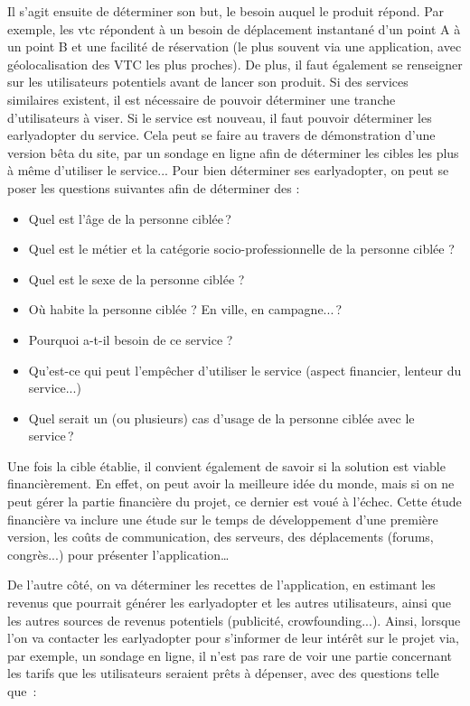 Il s'agit ensuite de déterminer son but, le besoin auquel le produit répond. Par exemple, les \gls{vtc} répondent à un besoin de déplacement instantané d'un point A à un point B et une facilité de réservation (le plus souvent via une application, avec géolocalisation des VTC les plus proches). De plus, il faut également se renseigner sur les utilisateurs potentiels avant de lancer son produit. Si des services similaires existent, il est nécessaire de pouvoir déterminer une tranche d'utilisateurs à viser. Si le service est nouveau, il faut pouvoir déterminer les \gls{earlyadopter} du service. Cela peut se faire au travers de démonstration d'une version bêta du site, par un sondage en ligne afin de déterminer les cibles les plus à même d'utiliser le service... Pour bien déterminer ses \gls{earlyadopter}, on peut se poser les questions suivantes afin de déterminer des  : 

\begin{itemize}
	\setlength\itemsep{-0.5em}
	\item Quel est l'âge de la personne ciblée ?
	\item Quel est le métier et la catégorie socio-professionnelle de la personne ciblée ?
	\item Quel est le sexe de la personne ciblée ? 
	\item Où habite la personne ciblée ? En ville, en campagne... ? 
	\item Pourquoi a-t-il besoin de ce service ? 
	\item Qu'est-ce qui peut l'empêcher d'utiliser le service (aspect financier, lenteur du service...) 
	\item Quel serait un (ou plusieurs) cas d'usage de la personne ciblée avec le service ?
\end{itemize}

Une fois la cible établie, il convient également de savoir si la solution est viable financièrement. En effet, on peut avoir la meilleure idée du monde, mais si on ne peut gérer la partie financière du projet, ce dernier est voué à l'échec. Cette étude financière va inclure une étude sur le temps de développement d'une première version, les coûts de communication, des serveurs, des déplacements (forums, congrès...) pour présenter l'application\ldots

De l'autre côté, on va déterminer les recettes de l'application, en estimant les revenus que pourrait générer les \gls{earlyadopter} et les autres utilisateurs, ainsi que les autres sources de revenus potentiels (publicité, crowfounding...). Ainsi, lorsque l'on va contacter les \gls{earlyadopter} pour s'informer de leur intérêt sur le projet via, par exemple, un sondage en ligne, il n'est pas rare de voir une partie concernant les tarifs que les utilisateurs seraient prêts à dépenser, avec des questions telle que :

